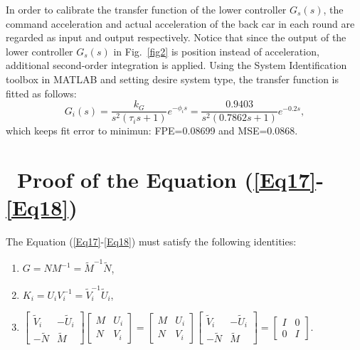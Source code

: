 \documentclass[trsc,nonblindrev]{informs3} %
\begin{document}
\begin{APPENDICES}
    In order to calibrate the transfer function of the lower controller $G_s (s)$, the command acceleration and actual acceleration of the back car in each round are regarded as input and output respectively. Notice that since the output of the lower controller $G_s (s)$ in Fig.~\ref{fig2} is position instead of acceleration, additional second-order integration is applied. Using the System Identification toolbox in MATLAB and setting desire system type, the transfer function is fitted as follows:
    \begin{equation}
        G_{i}(s)=\frac{k_{G}}{s^{2}\left(\tau_{i} s+1\right)} e^{-\phi_{i} s}=\frac{0.9403}{s^{2}(0.7862 s+1)} e^{-0.2 s},
    \end{equation}
    which keeps fit error to minimun: FPE=0.08699 and MSE=0.0868.

    \section{~Proof of the Equation (\ref{Eq17}-\ref{Eq18})}
    \label{AppendixB}

    The Equation (\ref{Eq17}-\ref{Eq18}) must satisfy the following identities:

    \begin{enumerate}
        \item $G=N M^{-1}=\tilde{M}^{-1} \tilde{N}$,
        \item $K_{i}=U_{i} V_{i}^{-1}=\tilde{V}_{i}^{-1} \tilde{U}_{i}$,
        \item    $ \left[\begin{array}{cc}
                          \tilde{V}_{i} & -\tilde{U}_{i} \\
                          -\tilde{N}    & \tilde{M}
                      \end{array}\right]\left[\begin{array}{cc}
                          M & U_{i} \\
                          N & V_{i}
                      \end{array}\right]=\left[\begin{array}{cc}
                          M & U_{i} \\
                          N & V_{i}
                      \end{array}\right]\left[\begin{array}{cc}
                          \tilde{V}_{i} & -\tilde{U}_{i} \\
                          -\tilde{N}    & \tilde{M}
                      \end{array}\right]=\left[\begin{array}{cc}
                          I & 0 \\
                          0 & I
                      \end{array}\right].$
    \end{enumerate}



\end{APPENDICES}
\end{document}
